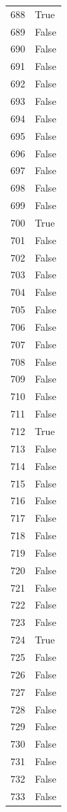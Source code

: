 \documentclass[
  letterpaper,
  DIV=11,
  numbers=noendperiod]{scrreprt}
\begin{document}
\begin{tabular}{ll}
688  &   True \\
689  &  False \\
690  &  False \\
691  &  False \\
692  &  False \\
693  &  False \\
694  &  False \\
695  &  False \\
696  &  False \\
697  &  False \\
698  &  False \\
699  &  False \\
700  &   True \\
701  &  False \\
702  &  False \\
703  &  False \\
704  &  False \\
705  &  False \\
706  &  False \\
707  &  False \\
708  &  False \\
709  &  False \\
710  &  False \\
711  &  False \\
712  &   True \\
713  &  False \\
714  &  False \\
715  &  False \\
716  &  False \\
717  &  False \\
718  &  False \\
719  &  False \\
720  &  False \\
721  &  False \\
722  &  False \\
723  &  False \\
724  &   True \\
725  &  False \\
726  &  False \\
727  &  False \\
728  &  False \\
729  &  False \\
730  &  False \\
731  &  False \\
732  &  False \\
733  &  False \\

\end{tabular}
\end{document}
